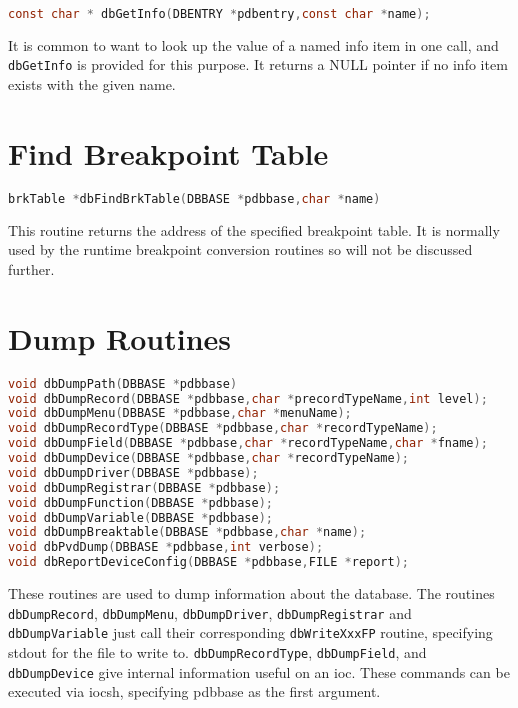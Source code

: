 \begin{lstlisting}[language=C]
const char * dbGetInfo(DBENTRY *pdbentry,const char *name);
\end{lstlisting}

It is common to want to look up the value of a named info item in one call, and \verb|dbGetInfo| is provided for this purpose. It returns a NULL pointer if no info item exists with the given name.

\section{Find Breakpoint Table}

\begin{lstlisting}[language=C]
brkTable *dbFindBrkTable(DBBASE *pdbbase,char *name)
\end{lstlisting}

This routine returns the address of the specified breakpoint table.
It is normally used by the runtime breakpoint conversion routines so will not be discussed further.

\section{Dump Routines}

\begin{lstlisting}[language=C]
void dbDumpPath(DBBASE *pdbbase)
void dbDumpRecord(DBBASE *pdbbase,char *precordTypeName,int level);
void dbDumpMenu(DBBASE *pdbbase,char *menuName);
void dbDumpRecordType(DBBASE *pdbbase,char *recordTypeName);
void dbDumpField(DBBASE *pdbbase,char *recordTypeName,char *fname);
void dbDumpDevice(DBBASE *pdbbase,char *recordTypeName);
void dbDumpDriver(DBBASE *pdbbase);
void dbDumpRegistrar(DBBASE *pdbbase);
void dbDumpFunction(DBBASE *pdbbase);
void dbDumpVariable(DBBASE *pdbbase);
void dbDumpBreaktable(DBBASE *pdbbase,char *name);
void dbPvdDump(DBBASE *pdbbase,int verbose);
void dbReportDeviceConfig(DBBASE *pdbbase,FILE *report);
\end{lstlisting}

These routines are used to dump information about the database.
The routines \verb|dbDumpRecord|, \verb|dbDumpMenu|, \verb|dbDumpDriver|, \verb|dbDumpRegistrar| and \verb|dbDumpVariable| just call their corresponding \verb|dbWriteXxxFP| routine, specifying stdout for the file to write to.
\verb|dbDumpRecordType|, \verb|dbDumpField|, and \verb|dbDumpDevice| give internal information useful on an ioc.
These commands can be executed via iocsh, specifying pdbbase as the first argument.

